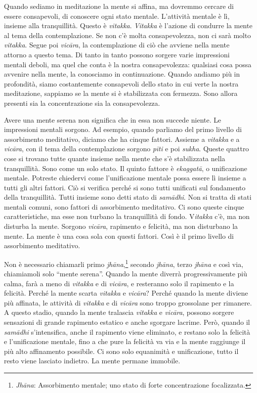 Quando sediamo in meditazione la mente si affina, ma dovremmo cercare di
essere consapevoli, di conoscere ogni stato mentale. L'attività mentale
è lì, insieme alla tranquillità. Questo è \emph{vitakka}. \emph{Vitakka}
è l'azione di condurre la mente al tema della contemplazione. Se non c'è
molta consapevolezza, non ci sarà molto \emph{vitakka}. Segue poi
\emph{vicāra}, la contemplazione di ciò che avviene nella mente attorno
a questo tema. Di tanto in tanto possono sorgere varie impressioni
mentali deboli, ma quel che conta è la nostra consapevolezza: qualsiasi
cosa possa avvenire nella mente, la conosciamo in continuazione. Quando
andiamo più in profondità, siamo costantemente consapevoli dello stato
in cui verte la nostra meditazione, sappiamo se la mente si è
stabilizzata con fermezza. Sono allora presenti sia la concentrazione
sia la consapevolezza.

Avere una mente serena non significa che in essa non succede niente. Le
impressioni mentali sorgono. Ad esempio, quando parliamo del primo
livello di assorbimento meditativo, diciamo che ha cinque fattori.
Assieme a \emph{vitakka} e a \emph{vicāra}, con il tema della
contemplazione sorgono \emph{pīti} e poi \emph{sukha}. Queste quattro
cose si trovano tutte quante insieme nella mente che s'è stabilizzata
nella tranquillità. Sono come un solo stato. Il quinto fattore è
\emph{ekaggatā}, o unificazione mentale. Potreste chiedervi come
l'unificazione mentale possa essere lì insieme a tutti gli altri
fattori. Ciò si verifica perché si sono tutti unificati sul fondamento
della tranquillità. Tutti insieme sono detti stato di \emph{samādhi}.
Non si tratta di stati mentali comuni, sono fattori di assorbimento
meditativo. Ci sono queste cinque caratteristiche, ma esse non turbano
la tranquillità di fondo. V\emph{itakka} c'è, ma non disturba la mente.
Sorgono \emph{vicāra}, rapimento e felicità, ma non disturbano la mente.
La mente è una cosa sola con questi fattori. Così è il primo livello di
assorbimento meditativo.

Non è necessario chiamarli primo \emph{jhāna},\footnote{\emph{Jhāna}:
  Assorbimento mentale; uno stato di forte concentrazione focalizzata.}
secondo \emph{jhāna}, terzo \emph{jhāna} e così via, chiamiamoli solo
``mente serena''. Quando la mente diverrà progressivamente più calma,
farà a meno di \emph{vitakka} e di \emph{vicāra}, e resteranno solo il
rapimento e la felicità. Perché la mente scarta \emph{vitakka} e
\emph{vicāra}? Perché quando la mente diviene più affinata, le attività
di \emph{vitakka} e di \emph{vicāra} sono troppo grossolane per
rimanere. A questo stadio, quando la mente tralascia \emph{vitakka} e
\emph{vicāra}, possono sorgere sensazioni di grande rapimento estatico e
anche sgorgare lacrime. Però, quando il \emph{samādhi} s'intensifica,
anche il rapimento viene eliminato, e restano solo la felicità e
l'unificazione mentale, fino a che pure la felicità va via e la mente
raggiunge il più alto affinamento possibile. Ci sono solo equanimità e
unificazione, tutto il resto viene lasciato indietro. La mente permane
immobile.

